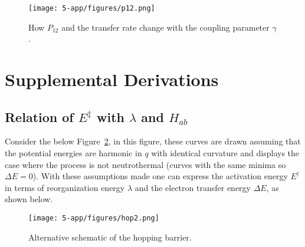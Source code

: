 \begin{figure}[H]
    \centering
    \texttt{[image: 5-app/figures/p12.png]}
    \caption{How $P_{12}$ and the transfer rate change with the coupling parameter $\gamma$.}
    \label{app:fig:p12}
\end{figure}

\section{Supplemental Derivations}

\subsection{Relation of $E^{\ddagger}$ with $\lambda$ and $H_{ab}$}
Consider the below Figure~\ref{app:fig:hop2}, in this figure, these curves are drawn assuming that the potential energies are harmonic in $q$ with identical curvature and displays the case where the process is not neutrothermal (curves with the same minima so $\Delta E = 0$). With these assumptions made one can express the activation energy $E^\dagger$ in terms of reorganization energy $\lambda$ and the electron transfer energy $\Delta E$, as shown below.

\begin{figure}[H]
    \centering
    \texttt{[image: 5-app/figures/hop2.png]}
    \caption{Alternative schematic of the hopping barrier.}
    \label{app:fig:hop2}
\end{figure}

